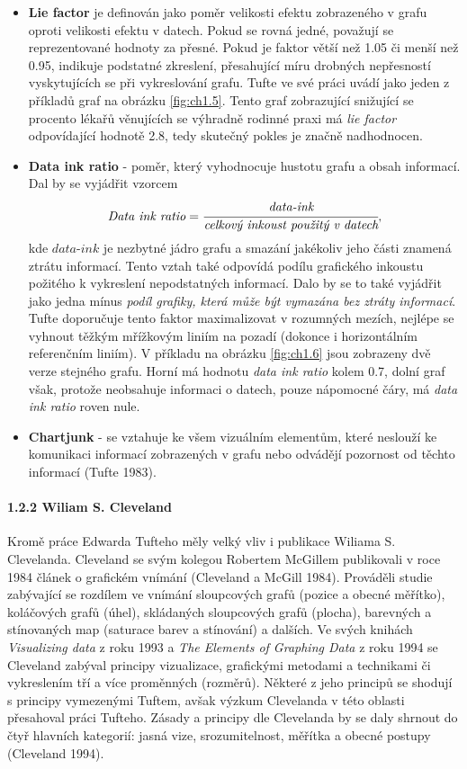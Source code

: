 \documentclass[12pt,]{article}
\let\oldparagraph\paragraph
\renewcommand{\paragraph}[1]{\oldparagraph{#1}\mbox{}}
\begin{document}
\begin{itemize}
\item
  \textbf{Lie factor} je definován jako poměr velikosti efektu
  zobrazeného v grafu oproti velikosti efektu v datech. Pokud se rovná
  jedné, považují se reprezentované hodnoty za přesné. Pokud je faktor
  větší než 1.05 či menší než 0.95, indikuje podstatné zkreslení,
  přesahující míru drobných nepřesností vyskytujících se při
  vykreslování grafu. Tufte ve své práci uvádí jako jeden z příkladů
  graf na obrázku \ref{fig:ch1.5}. Tento graf zobrazující snižující se
  procento lékařů věnujících se výhradně rodinné praxi má \emph{lie
  factor} odpovídající hodnotě 2.8, tedy skutečný pokles je značně
  nadhodnocen.
\item
  \textbf{Data ink ratio} - poměr, který vyhodnocuje hustotu grafu a
  obsah informací. Dal by se vyjádřit vzorcem
  \[\textit{Data ink ratio} = \cfrac{\textit{data-ink}}{\textit{celkový inkoust použitý v datech}},\]
  kde \(\textit{data-ink}\) je nezbytné jádro grafu a smazání jakékoliv
  jeho části znamená ztrátu informací. Tento vztah také odpovídá podílu
  grafického inkoustu požitého k vykreslení nepodstatných informací.
  Dalo by se to také vyjádřit jako jedna mínus
  \textit{podíl grafiky, která může být vymazána bez ztráty informací}.
  Tufte doporučuje tento faktor maximalizovat v rozumných mezích,
  nejlépe se vyhnout těžkým mřížkovým liniím na pozadí (dokonce i
  horizontálním referenčním liniím). V příkladu na obrázku
  \ref{fig:ch1.6} jsou zobrazeny dvě verze stejného grafu. Horní má
  hodnotu \emph{data ink ratio} kolem 0.7, dolní graf však, protože
  neobsahuje informaci o datech, pouze nápomocné čáry, má \emph{data ink
  ratio} roven nule.
\item
  \textbf{Chartjunk} - se vztahuje ke všem vizuálním elementům, které
  neslouží ke komunikaci informací zobrazených v grafu nebo odvádějí
  pozornost od těchto informací (Tufte 1983).
\end{itemize}

\hypertarget{cleveland}{\paragraph{1.2.2 Wiliam S.
Cleveland}\label{cleveland}}

\qquad Kromě práce Edwarda Tufteho měly velký vliv i publikace Wiliama
S. Clevelanda. Cleveland se svým kolegou Robertem McGillem publikovali v
roce 1984 článek o grafickém vnímání (Cleveland a McGill 1984).
Prováděli studie zabývající se rozdílem ve vnímání sloupcových grafů
(pozice a obecné měřítko), koláčových grafů (úhel), skládaných
sloupcových grafů (plocha), barevných a stínovaných map (saturace barev
a stínování) a dalších. Ve svých knihách \emph{Visualizing data} z roku
1993 a \emph{The Elements of Graphing Data} z roku 1994 se Cleveland
zabýval principy vizualizace, grafickými metodami a technikami či
vykreslením tří a více proměnných (rozměrů). Některé z jeho principů se
shodují s principy vymezenými Tuftem, avšak výzkum Clevelanda v této
oblasti přesahoval práci Tufteho. Zásady a principy dle Clevelanda by se
daly shrnout do čtyř hlavních kategorií: jasná vize, srozumitelnost,
měřítka a obecné postupy (Cleveland 1994).
\end{document}
